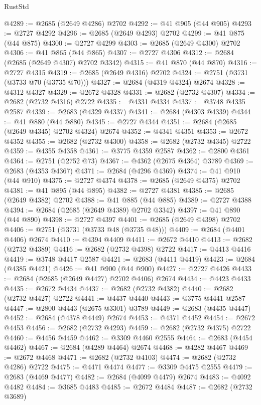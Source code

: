 \begin{lexlean}{RustStd}
\begin{coremodule}
@4289 := @2685 (@2649 @4286) @2702
@4292 := @41 @905 (@44 @905)
@4293 := @2727 @4292
@4296 := @2685 (@2649 @4293) @2702
@4299 := @41 @875 (@44 @875)
@4300 := @2727 @4299
@4303 := @2685 (@2649 @4300) @2702
@4306 := @41 @865 (@44 @865)
@4307 := @2727 @4306
@4312 := @2684 (@2685 (@2649 @4307) @2702 @3342)
@4315 := @41 @870 (@44 @870)
@4316 := @2727 @4315
@4319 := @2685 (@2649 @4316) @2702
@4324 := @2751 (@3731 (@3733 @70 (@3735 @70)))
@4327 := @2684 (@4319 @4324) @2674
@4328 := @4312 @4327
@4329 := @2672 @4328
@4331 := @2682 (@2732 @4307)
@4334 := @2682 (@2732 @4316) @2722
@4335 := @4331 @4334
@4337 := @3748 @4335 @2587
@4339 := @2683 (@4329 @4337)
@4341 := @2684 (@4303 @4339)
@4344 := @41 @880 (@44 @880)
@4345 := @2727 @4344
@4351 := @2684 (@2685 (@2649 @4345) @2702 @4324) @2674
@4352 := @4341 @4351
@4353 := @2672 @4352
@4355 := @2682 (@2732 @4300)
@4358 := @2682 (@2732 @4345) @2722
@4359 := @4355 @4358
@4361 := @3775 @4359 @2587
@4362 := @2800 @4361
@4364 := @2751 (@2752 @73)
@4367 := @4362 (@2675 @4364) @3789
@4369 := @2683 (@4353 @4367)
@4371 := @2684 (@4296 @4369)
@4374 := @41 @910 (@44 @910)
@4375 := @2727 @4374
@4378 := @2685 (@2649 @4375) @2702
@4381 := @41 @895 (@44 @895)
@4382 := @2727 @4381
@4385 := @2685 (@2649 @4382) @2702
@4388 := @41 @885 (@44 @885)
@4389 := @2727 @4388
@4394 := @2684 (@2685 (@2649 @4389) @2702 @3342)
@4397 := @41 @890 (@44 @890)
@4398 := @2727 @4397
@4401 := @2685 (@2649 @4398) @2702
@4406 := @2751 (@3731 (@3733 @48 (@3735 @48)))
@4409 := @2684 (@4401 @4406) @2674
@4410 := @4394 @4409
@4411 := @2672 @4410
@4413 := @2682 (@2732 @4389)
@4416 := @2682 (@2732 @4398) @2722
@4417 := @4413 @4416
@4419 := @3748 @4417 @2587
@4421 := @2683 (@4411 @4419)
@4423 := @2684 (@4385 @4421)
@4426 := @41 @900 (@44 @900)
@4427 := @2727 @4426
@4433 := @2684 (@2685 (@2649 @4427) @2702 @4406) @2674
@4434 := @4423 @4433
@4435 := @2672 @4434
@4437 := @2682 (@2732 @4382)
@4440 := @2682 (@2732 @4427) @2722
@4441 := @4437 @4440
@4443 := @3775 @4441 @2587
@4447 := @2800 @4443 (@2675 @3301) @3789
@4449 := @2683 (@4435 @4447)
@4452 := @2684 (@4378 @4449) @2674
@4453 := @4371 @4452
@4454 := @2672 @4453
@4456 := @2682 (@2732 @4293)
@4459 := @2682 (@2732 @4375) @2722
@4460 := @4456 @4459
@4462 := @3309 @4460 @2555
@4464 := @2683 (@4454 @4462)
@4467 := @2684 (@4289 @4464) @2674
@4468 := @4282 @4467
@4469 := @2672 @4468
@4471 := @2682 (@2732 @4103)
@4474 := @2682 (@2732 @4286) @2722
@4475 := @4471 @4474
@4477 := @3309 @4475 @2555
@4479 := @2683 (@4469 @4477)
@4482 := @2684 (@4099 @4479) @2674
@4483 := @4092 @4482
@4484 := @3685 @4483
@4485 := @2672 @4484
@4487 := @2682 (@2732 @3689)

\end{coremodule}
\end{lexlean}
